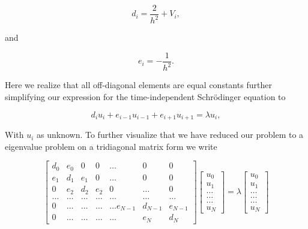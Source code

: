 \documentclass[12pt]{article}
\numberwithin{figure}{section}
\numberwithin{table}{section}
\begin{document}
\begin{equation*}
   d_i=\frac{2}{h^2}+V_i,
\end{equation*}

\noindent and 

\begin{equation*}
   e_i=-\frac{1}{h^2}.
\end{equation*}

\noindent Here we realize that all off-diagonal elements are equal constants further simplifying our expression for the time-independent Schrödinger equation to \cite{pro2}

\begin{equation}
d_iu_i+e_{i-1}u_{i-1}+e_{i+1}u_{i+1}  = \lambda u_i, \label{eq:discrete_eq}
\end{equation}

\noindent With $u_i$ as unknown. To further visualize that we have reduced our problem to a eigenvalue problem on a tridiagonal matrix form we write \cite{pro2}

\begin{equation}
    \begin{bmatrix}d_0 & e_0 & 0   & 0    & \dots  &0     & 0 \\
                                e_1 & d_1 & e_1 & 0    & \dots  &0     &0 \\
                                0   & e_2 & d_2 & e_2  &0       &\dots & 0\\
                                \dots  & \dots & \dots & \dots  &\dots      &\dots & \dots\\
                                0   & \dots & \dots & \dots  &\dots  e_{N-1}     &d_{N-1} & e_{N-1}\\
                                0   & \dots & \dots & \dots  &\dots       &e_{N} & d_{N}
             \end{bmatrix}  \begin{bmatrix} u_{0} \\
                                                              u_{1} \\
                                                              \dots\\ \dots\\ \dots\\
                                                              u_{N}
             \end{bmatrix}=\lambda \begin{bmatrix} u_{0} \\
                                                              u_{1} \\
                                                              \dots\\ \dots\\ \dots\\
                                                              u_{N}
             \end{bmatrix} \label{eq:eig_rep}
\end{equation}
\end{document}
